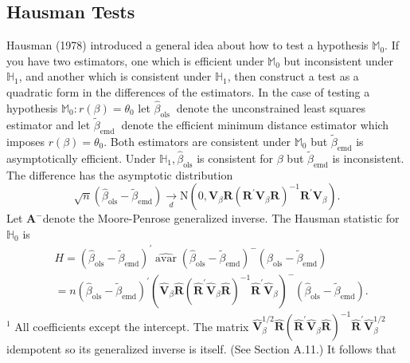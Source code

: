 \documentclass[10pt]{article}
\begin{document}
\subsection{Hausman Tests}
Hausman (1978) introduced a general idea about how to test a hypothesis $\mathbb{M}_{0}$. If you have two estimators, one which is efficient under $\mathbb{M}_{0}$ but inconsistent under $\mathbb{H}_{1}$, and another which is consistent under $\mathbb{H}_{1}$, then construct a test as a quadratic form in the differences of the estimators. In the case of testing a hypothesis $\mathbb{M}_{0}: r(\beta)=\theta_{0}$ let $\widehat{\beta}_{\text {ols }}$ denote the unconstrained least squares estimator and let $\widetilde{\beta}_{\text {emd }}$ denote the efficient minimum distance estimator which imposes $r(\beta)=\theta_{0}$. Both estimators are consistent under $\mathbb{M}_{0}$ but $\widetilde{\beta}_{\mathrm{emd}}$ is asymptotically efficient. Under $\mathbb{H}_{1}, \widehat{\beta}_{\mathrm{ols}}$ is consistent for $\beta$ but $\widetilde{\beta}_{\mathrm{emd}}$ is inconsistent. The difference has the asymptotic distribution
$$
\sqrt{n}\left(\widehat{\beta}_{\mathrm{ols}}-\widetilde{\beta}_{\mathrm{emd}}\right) \underset{d}{\longrightarrow} \mathrm{N}\left(0, \boldsymbol{V}_{\beta} \boldsymbol{R}\left(\boldsymbol{R}^{\prime} \boldsymbol{V}_{\beta} \boldsymbol{R}\right)^{-1} \boldsymbol{R}^{\prime} \boldsymbol{V}_{\beta}\right) .
$$
Let $\boldsymbol{A}^{-}$denote the Moore-Penrose generalized inverse. The Hausman statistic for $\mathbb{H}_{0}$ is
$$
\begin{aligned}
& H=\left(\widehat{\beta}_{\mathrm{ols}}-\widetilde{\beta}_{\mathrm{emd}}\right)^{\prime} \widehat{\operatorname{avar}}\left(\widehat{\beta}_{\mathrm{ols}}-\widetilde{\beta}_{\mathrm{emd}}\right)^{-}\left(\widehat{\beta}_{\mathrm{ols}}-\widetilde{\beta}_{\mathrm{emd}}\right) \\
& =n\left(\widehat{\beta}_{\mathrm{ols}}-\widetilde{\beta}_{\mathrm{emd}}\right)^{\prime}\left(\widehat{\boldsymbol{V}}_{\beta} \widehat{\boldsymbol{R}}\left(\widehat{\boldsymbol{R}}^{\prime} \widehat{\boldsymbol{V}}_{\beta} \widehat{\boldsymbol{R}}\right)^{-1} \widehat{\boldsymbol{R}}^{\prime} \widehat{\boldsymbol{V}}_{\beta}\right)^{-}\left(\widehat{\beta}_{\mathrm{ols}}-\widetilde{\beta}_{\mathrm{emd}}\right) .
\end{aligned}
$$
${ }^{1}$ All coefficients except the intercept. The matrix $\widehat{\boldsymbol{V}}_{\beta}^{1 / 2} \widehat{\boldsymbol{R}}\left(\widehat{\boldsymbol{R}}^{\prime} \widehat{\boldsymbol{V}}_{\beta} \widehat{\boldsymbol{R}}\right)^{-1} \widehat{\boldsymbol{R}}^{\prime} \widehat{\boldsymbol{V}}_{\beta}^{1 / 2}$ idempotent so its generalized inverse is itself. (See Section A.11.) It follows that
\end{document}
